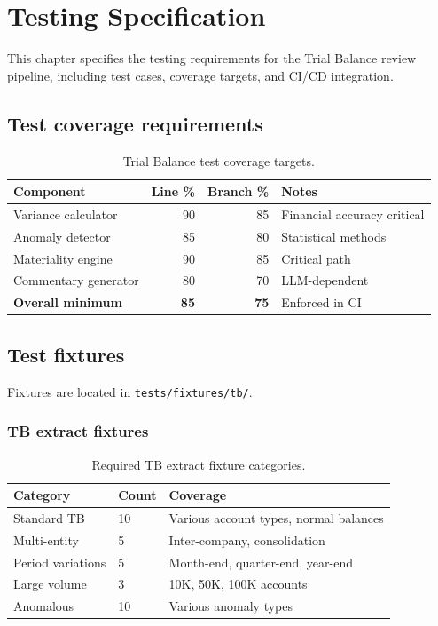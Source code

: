 \chapter{Testing Specification}\label{ch:testing}

This chapter specifies the testing requirements for the Trial Balance review
pipeline, including test cases, coverage targets, and CI/CD integration.

\section{Test coverage requirements}

\begin{table}[htbp]
\centering
\caption{Trial Balance test coverage targets.}
\label{tab:tb-coverage}
\footnotesize
\begin{tabularx}{\linewidth}{@{}l r r X@{}}
\toprule
\textbf{Component} & \textbf{Line \%} & \textbf{Branch \%} & \textbf{Notes} \\ \midrule
Variance calculator & 90 & 85 & Financial accuracy critical \\
Anomaly detector & 85 & 80 & Statistical methods \\
Materiality engine & 90 & 85 & Critical path \\
Commentary generator & 80 & 70 & LLM-dependent \\
\textbf{Overall minimum} & \textbf{85} & \textbf{75} & Enforced in CI \\
\bottomrule
\end{tabularx}
\end{table}

\section{Test fixtures}

Fixtures are located in \texttt{tests/fixtures/tb/}.

\subsection{TB extract fixtures}

\begin{table}[htbp]
\centering
\caption{Required TB extract fixture categories.}
\footnotesize
\begin{tabularx}{\linewidth}{@{}l l X@{}}
\toprule
\textbf{Category} & \textbf{Count} & \textbf{Coverage} \\ \midrule
Standard TB & 10 & Various account types, normal balances \\
Multi-entity & 5 & Inter-company, consolidation \\
Period variations & 5 & Month-end, quarter-end, year-end \\
Large volume & 3 & 10K, 50K, 100K accounts \\
Anomalous & 10 & Various anomaly types \\
\bottomrule
\end{tabularx}
\end{table}

